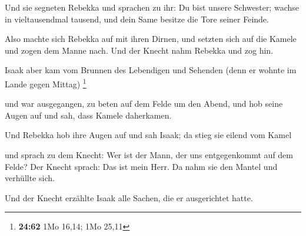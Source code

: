  Und sie segneten Rebekka und sprachen zu ihr: Du bist
unsere Schwester; wachse in vieltausendmal tausend, und dein Same
besitze die Tore seiner Feinde.

 Also machte sich Rebekka auf mit ihren Dirnen, und setzten
sich auf die Kamele und zogen dem Manne nach. Und der Knecht nahm
Rebekka und zog hin.

 Isaak aber kam vom Brunnen des Lebendigen und Sehenden
(denn er wohnte im Lande gegen Mittag) \footnote{\textbf{24:62} 1Mo
  16,14; 1Mo 25,11}

 und war ausgegangen, zu beten auf dem Felde um den Abend,
und hob seine Augen auf und sah, dass Kamele daherkamen.

 Und Rebekka hob ihre Augen auf und sah Isaak; da stieg sie
eilend vom Kamel

 und sprach zu dem Knecht: Wer ist der Mann, der uns
entgegenkommt auf dem Felde? Der Knecht sprach: Das ist mein Herr. Da
nahm sie den Mantel und verhüllte sich.

 Und der Knecht erzählte Isaak alle Sachen, die er
ausgerichtet hatte.

